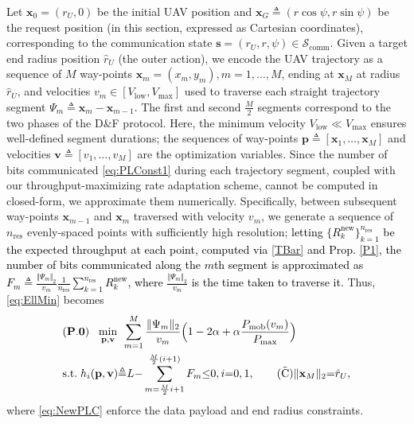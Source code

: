 \documentclass[10pt, twocolumn]{IEEEtran}
\theoremstyle{plain}
\theoremstyle{definition}
\theoremstyle{remark}
\newcommand\hlt[1]{\textcolor{black}{#1}}
\begin{document}
Let $\mathbf x_0=(r_U,0)$ be the initial UAV position and $\mathbf{x}_G{\triangleq}(r\cos{\psi},r\sin{\psi})$ be the request position (in this section, expressed as Cartesian coordinates), corresponding to the communication state $\mathbf{s}{=}(r_{U},r,\psi){\in}\mathcal{S}_{\mathrm{comm}}$. Given a target end radius position $\hat{r}_{U}$ (the outer action), we encode the UAV trajectory as a sequence of $M$ way-points $\mathbf{x}_{m}{=}(x_{m},y_{m}),m=1,\dots,M$, ending at $\mathbf{x}_{M}$ at radius $\hat r_U$, and velocities $v_{m}{\in}[V_{\mathrm{low}},V_{\mathrm{max}}]$ used to traverse each straight trajectory segment $\Psi_{m}{\triangleq}\mathbf{x}_{m}{-}\mathbf{x}_{m{-}1}$. The first and second $\frac{M}{2}$ segments correspond to the two phases of the D\&F protocol. Here, the minimum velocity $V_{\mathrm{low}}{\ll}V_{\mathrm{max}}$  ensures well-defined segment durations; the sequences of way-points $\mathbf{p}{\triangleq}[\mathbf{x}_{1},{\dots},\mathbf{x}_{M}]$ and velocities $\mathbf{v}{\triangleq}[v_{1},{\dots},v_{M}]$ are the optimization variables. Since the number of bits communicated \eqref{eq:PLConst1} during each trajectory segment, coupled with our throughput-maximizing rate adaptation scheme, cannot be computed in closed-form, we approximate them numerically. Specifically, between subsequent way-points $\mathbf{x}_{m-1}$ and $\mathbf{x}_{m}$ traversed with velocity $v_{m}$, we generate a sequence of $n_{\mathrm{res}}$ evenly-spaced points with sufficiently high resolution; \hlt{letting $\{R_{k}^{\mathrm{new}}\}_{k{=}1}^{n_{\mathrm{res}}}$ be the expected throughput at each point,
computed via \eqref{TBar} and Prop. \ref{P1}, the number of bits communicated along the $m$th segment is approximated as $F_{m}{\triangleq}\frac{\Vert\Psi_{m}\Vert_2}{v_m}\frac{1}{n_{\mathrm{res}}}\sum_{k{=}1}^{n_{\mathrm{res}}}R_{k}^{\mathrm{new}}$, where $\frac{\Vert\Psi_{m}\Vert_{2}}{v_{m}}$ is the time taken to traverse it.} Thus, \eqref{eq:EllMin} becomes
\begin{align}
    &(\mathbf{P.0})\;\;\; \underset{\mathbf p,\mathbf v}{\mathrm{min}} \;\,  \sum_{m=1}^{M} \frac{\Vert \Psi_m \Vert_2}{v_m}\Big(1-2\alpha+\alpha \frac{P_{\mathrm{mob}}(v_m)}{P_{\max}}\Big) \label{eq:HeurMin}\\
    &\mathrm{s.t.}\; h_{i}(\mathbf p ,\mathbf v){\triangleq}L{-}\sum_{m{=}\frac{M}{2}i{+}1}^{\frac{M}{2}(i{+}1)}F_{m}{\leq}0,i{=}0,1,\label{eq:NewPLC}\tag{$\tilde{\text{C}}$}
    \Vert\mathbf x_{M}\Vert_2{=} \hat{r}_U,
\end{align}
where \ref{eq:NewPLC} enforce the data payload and end radius constraints. 
\end{document}
